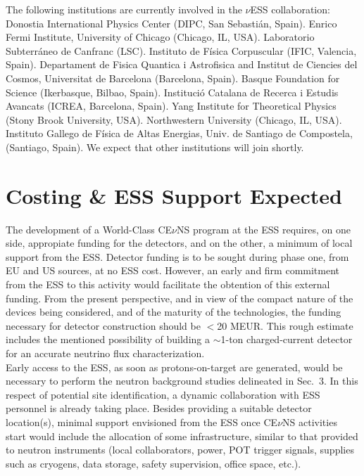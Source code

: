\documentclass[12pt]{article}
\begin{document}
The following institutions are currently involved in the $\nu$ESS collaboration: Donostia  International  Physics  Center  (DIPC, San Sebasti\'an, Spain). Enrico Fermi Institute, University  of  Chicago (Chicago, IL, USA). Laboratorio Subterr\'aneo de Canfranc (LSC). Instituto  de  F\'isica  Corpuscular (IFIC, Valencia, Spain).  Departament  de  Fisica  Quantica  i  Astrofisica  and  Institut  de  Ciencies  del  Cosmos, Universitat  de  Barcelona  (Barcelona, Spain).  Basque  Foundation  for  Science (Ikerbasque,  Bilbao, Spain).  Instituci\'o  Catalana  de  Recerca  i  Estudis  Avancats  (ICREA, Barcelona, Spain).  Yang  Institute  for  Theoretical  Physics  (Stony  Brook  University, USA). Northwestern University (Chicago, IL, USA). Instituto 
Gallego  de  F\'isica  de  Altas  Energias,  Univ.  de  Santiago  de  Compostela, (Santiago, Spain). We expect that other institutions will join shortly. 

\newpage

\section{Costing \& ESS Support Expected}

The development of a World-Class CE$\nu$NS program at the ESS requires, on one side, appropiate funding for the detectors, and on the other, a minimum of local support from the ESS.  Detector funding is to be sought during phase one, from EU and US sources, at no ESS cost. However, an early and firm commitment from the ESS to this activity would facilitate the obtention of this external funding. From the present perspective, and in view of the compact nature of the devices being considered, and of the maturity of the technologies, the funding necessary for detector construction should be  $<$20 MEUR. This rough estimate includes the mentioned possibility of building a $\sim$1-ton charged-current detector for an accurate neutrino flux characterization.\\

Early access to the ESS, as soon as protons-on-target are generated, would be necessary  to perform the neutron background studies delineated in Sec.\ 3. In this respect of potential site identification,  a dynamic collaboration with ESS personnel is already taking place. Besides providing a suitable detector location(s), minimal support envisioned from the ESS once CE$\nu$NS activities start would include  the allocation of some infrastructure, similar to that provided to neutron instruments (local collaborators, power, POT trigger signals, supplies such as cryogens, data storage, safety supervision, office space, etc.).
\end{document}

